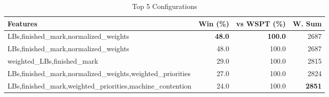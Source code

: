 \begin{table}[htbp]%
\centering%
\begin{tabular}{lrrr}%
\toprule%
\textbf{Features}&\textbf{Win (\%)}&\textbf{vs WSPT (\%)}&\textbf{W. Sum}\\%
\midrule%
LBs,finished_mark,normalized_weights&\textbf{48.0}&\textbf{100.0}&2687\\%
LBs,finished_mark,normalized_weights&48.0&100.0&2687\\%
weighted_LBs,finished_mark&29.0&100.0&2815\\%
LBs,finished_mark,normalized_weights,weighted_priorities&27.0&100.0&2824\\%
LBs,finished_mark,weighted_priorities,machine_contention&24.0&100.0&\textbf{2851}\\%
\bottomrule%
\end{tabular}%
\caption{Top 5 Configurations}%
\label{tab:summary}%
\end{table}